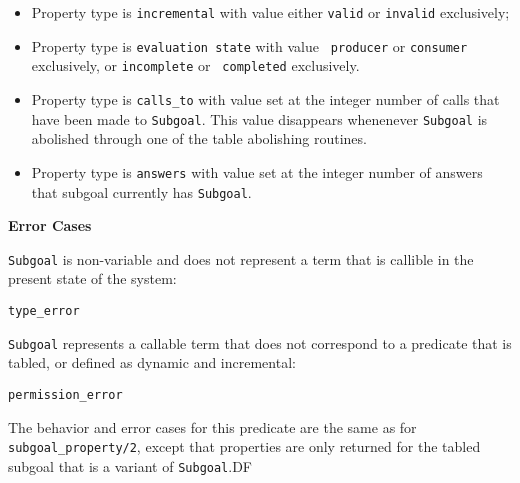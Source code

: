 \begin{description}
\begin{itemize}
\item Property type is {\tt incremental} with value either {\tt valid}
  or {\tt invalid} exclusively;
\item Property type is {\tt evaluation state} with value {\tt
  producer} or {\tt consumer} exclusively, or {\tt incomplete} or {\tt
  completed} exclusively.
\item Property type is {\tt calls\_to} with value set at the integer
  number of calls that have been made to {\tt Subgoal}.  This value
  disappears whenenever {\tt Subgoal} is abolished through one of the
  table abolishing routines.
\item Property type is {\tt answers} with value set at the integer
  number of answers that subgoal currently has {\tt Subgoal}.
\end{itemize}

{\bf Error Cases}
\bi
\item {\tt Subgoal} is non-variable and does not represent a term that
  is callible in the present state of the system: 
\bi
 \item 	{\tt type\_error}
\ei
\item {\tt Subgoal} represents a callable term that does not
  correspond to a predicate that is tabled, or defined as dynamic and
  incremental:
\bi
\item 	{\tt permission\_error}
\ei
\ei

%
The behavior and error cases for this predicate are the same as for
{\tt subgoal\_property/2}, except that properties are only returned
for the tabled subgoal that is a variant of {\tt Subgoal}.DF


\end{description}
